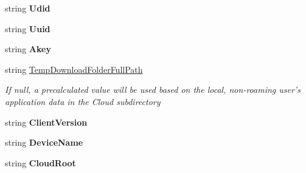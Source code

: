 \begin{DoxyCompactItemize}
\item 
\hypertarget{interface_cloud_api_public_1_1_interfaces_1_1_i_sync_settings_a44b1018bb458538474dce1805ff3e028}{string {\bfseries Udid}}\label{interface_cloud_api_public_1_1_interfaces_1_1_i_sync_settings_a44b1018bb458538474dce1805ff3e028}

\item 
\hypertarget{interface_cloud_api_public_1_1_interfaces_1_1_i_sync_settings_a6014bb7c41521002aad9efbb24edee39}{string {\bfseries Uuid}}\label{interface_cloud_api_public_1_1_interfaces_1_1_i_sync_settings_a6014bb7c41521002aad9efbb24edee39}

\item 
\hypertarget{interface_cloud_api_public_1_1_interfaces_1_1_i_sync_settings_ae970f7b45fde2d7711c52580ad186b26}{string {\bfseries Akey}}\label{interface_cloud_api_public_1_1_interfaces_1_1_i_sync_settings_ae970f7b45fde2d7711c52580ad186b26}

\item 
string \hyperlink{interface_cloud_api_public_1_1_interfaces_1_1_i_sync_settings_aeb43d43ce6edd995f17fc9bb9b303f8a}{Temp\-Download\-Folder\-Full\-Path}
\begin{DoxyCompactList}\small\item\em If null, a precalculated value will be used based on the local, non-\/roaming user's application data in the Cloud subdirectory \end{DoxyCompactList}\item 
\hypertarget{interface_cloud_api_public_1_1_interfaces_1_1_i_sync_settings_a10e2af418073326f5ff218b13faee6c6}{string {\bfseries Client\-Version}}\label{interface_cloud_api_public_1_1_interfaces_1_1_i_sync_settings_a10e2af418073326f5ff218b13faee6c6}

\item 
\hypertarget{interface_cloud_api_public_1_1_interfaces_1_1_i_sync_settings_a4aeb912b78967724ebfbf45c26d2366b}{string {\bfseries Device\-Name}}\label{interface_cloud_api_public_1_1_interfaces_1_1_i_sync_settings_a4aeb912b78967724ebfbf45c26d2366b}

\item 
\hypertarget{interface_cloud_api_public_1_1_interfaces_1_1_i_sync_settings_ad67dd7a8c6a5d14d0685532f8344a4ae}{string {\bfseries Cloud\-Root}}\label{interface_cloud_api_public_1_1_interfaces_1_1_i_sync_settings_ad67dd7a8c6a5d14d0685532f8344a4ae}

\end{DoxyCompactItemize}


